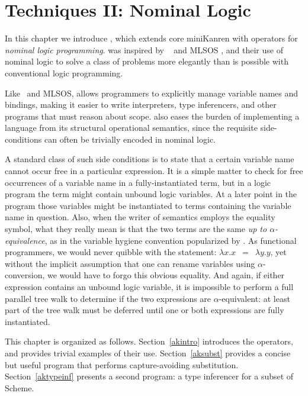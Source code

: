 \chapter{Techniques II:  Nominal Logic}\label{akchapter}

In this chapter we introduce \alphakanren, which extends core miniKanren with
operators for \emph{nominal logic programming}.  \alphakanrensp was inspired by
\alphaprolog\ \cite{CheneyThesis,CheneyU04} and MLSOS \cite{lakin2007},
and their use of nominal logic \cite{Pitts03} to solve a class of
problems more elegantly than is possible with conventional logic
programming.

Like \alphaprolog\ and MLSOS, \alphakanrensp allows programmers to explicitly manage
variable names and bindings, making it easier to write interpreters, type
inferencers, and other programs that must reason about scope.  \alphakanrensp
also eases the burden of implementing a language from its structural
operational semantics, since the requisite side-conditions 
can often be trivially encoded in nominal logic.

A standard class of such side conditions is to state that a certain
variable name cannot occur free in a particular expression.  It is a
simple matter to check for free occurrences of a variable name in a
fully-instantiated term, but in a logic program the term might contain
unbound logic variables.  At a later point in the program those
variables might be instantiated to terms containing the variable name
in question.  Also, when the writer of semantics employs the equality
symbol, what they really mean is that the two terms are the same \emph{up
  to $\alpha$-equivalence}, as in the variable hygiene convention
popularized by \citet{barendregt84}.  As functional programmers, we
would never quibble with the statement: \mbox{$\lambda x.x$ $=$
  $\lambda y.y$}, yet without the implicit assumption that one can
rename variables using $\alpha$-conversion, we would have to forgo
this obvious equality.  And again, if either expression contains an
unbound logic variable, it is impossible to perform a full parallel
tree walk to determine if the two expressions are $\alpha$-equivalent:
at least part of the tree walk must be deferred until one or both
expressions are fully instantiated.

This chapter is organized as follows.  Section~\ref{akintro}
introduces the \alphakanrensp operators, and provides trivial examples
of their use.  Section~\ref{aksubst} provides a concise but useful
\alphakanrensp program that performs capture-avoiding substitution.
Section~\ref{aktypeinf} presents a second \alphakanrensp program: a
type inferencer for a subset of Scheme.

